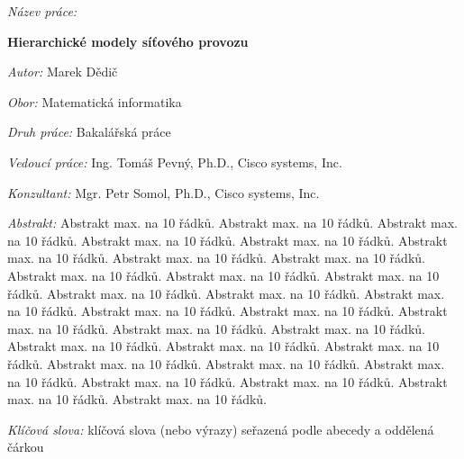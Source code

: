 \begin{onehalfspace}
	\noindent \textit{Název práce:}

	\noindent \textbf{Hierarchické modely síťového provozu}
\end{onehalfspace}

\bigskip

\noindent \textit{Autor:} Marek Dědič

\bigskip

\noindent \textit{Obor:} Matematická informatika

\bigskip

\noindent \textit{Druh práce:} Bakalářská práce

\bigskip

\noindent \textit{Vedoucí práce:} Ing. Tomáš Pevný, Ph.D., Cisco systems, Inc.

\bigskip

\noindent \textit{Konzultant:} Mgr. Petr Somol, Ph.D., Cisco systems, Inc.

\bigskip

\noindent \textit{Abstrakt:} Abstrakt max. na 10 řádků. Abstrakt max. na 10 řádků. Abstrakt max. na 10 řádků. Abstrakt max. na 10 řádků. Abstrakt max. na 10 řádků. Abstrakt max. na 10 řádků. Abstrakt max. na 10 řádků. Abstrakt max. na 10 řádků. Abstrakt max. na 10 řádků. Abstrakt max. na 10 řádků. Abstrakt max. na 10 řádků. Abstrakt max. na 10 řádků. Abstrakt max. na 10 řádků. Abstrakt max. na 10 řádků. Abstrakt max. na 10 řádků. Abstrakt max. na 10 řádků. Abstrakt max. na 10 řádků. Abstrakt max. na 10 řádků. Abstrakt max. na 10 řádků. Abstrakt max. na 10 řádků. Abstrakt max. na 10 řádků. Abstrakt max. na 10 řádků. Abstrakt max. na 10 řádků. Abstrakt max. na 10 řádků. Abstrakt max. na 10 řádků. Abstrakt max. na 10 řádků. Abstrakt max. na 10 řádků. Abstrakt max. na 10 řádků. Abstrakt max. na 10 řádků. 

\bigskip

\noindent \textit{Klíčová slova:} klíčová slova (nebo výrazy) seřazená
podle abecedy a oddělená čárkou

\vfill


